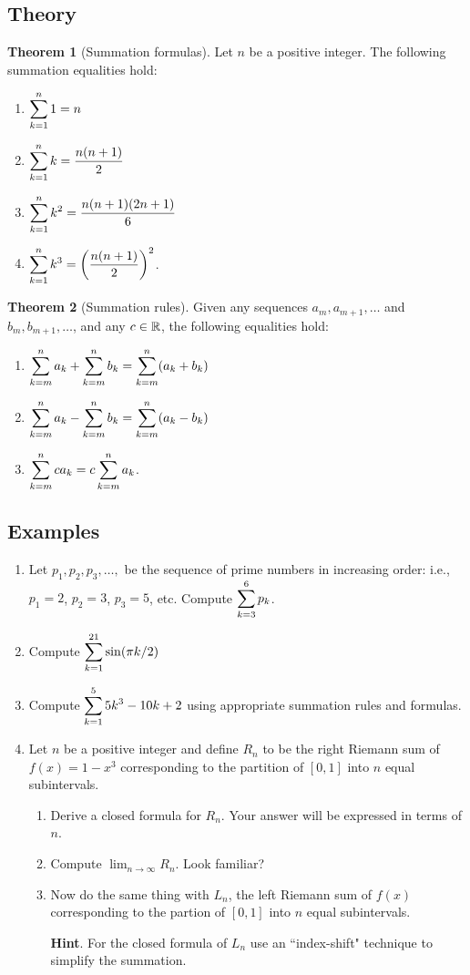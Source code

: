 \documentclass[11pt]{article}
\theoremstyle{definition}
\theoremstyle{named}
\newtheorem*{namedtheorem}{Theorem}
\numberwithin{myalgctr}{section}
\begin{document}
 \subsection*{Theory}
 \begin{namedtheorem}[Summation formulas] Let $n$ be a positive integer. The following summation equalities hold:
   \begin{enumerate}[topsep=0pt, itemsep=0pt]
     \item $\displaystyle\sum_{k=1}^n 1=n$
     \item $\displaystyle \sum_{k=1}^nk=\frac{n(n+1)}{2}$
     \item $\displaystyle\sum_{k=1}^nk^2=\frac{n(n+1)(2n+1)}{6}$
     \item $\displaystyle \sum_{k=1}^nk^3=\left(\frac{n(n+1)}{2}\right)^2$.
   \end{enumerate}

 \end{namedtheorem}
\begin{namedtheorem}[Summation rules]
Given any sequences $a_m, a_{m+1}, \dots$ and $b_m, b_{m+1}, \dots$, and any $c\in {\mathbb R}$, the following equalities hold:
\begin{enumerate}
  \item $\displaystyle\sum_{k=m}^na_k+\sum_{k=m}^nb_k=\sum_{k=m}^n(a_k+b_k)$
  \item $\displaystyle\sum_{k=m}^na_k-\sum_{k=m}^nb_k=\sum_{k=m}^n(a_k-b_k)$
  \item $\displaystyle\sum_{k=m}^nca_k=c\sum_{k=m}^na_k$.
\end{enumerate}

\end{namedtheorem}

\subsection*{Examples}
\begin{enumerate}
  \item Let $p_1, p_2,p_3, \dots, $ be the sequence of prime numbers in increasing order: i.e., $p_1=2$, $p_2=3$, $p_3=5$, etc. Compute
  $
  \displaystyle\sum_{k=3}^{6}p_k
  $.
  \item Compute
  $
  \displaystyle \sum_{k=1}^{21}\sin(\pi k/2)
  $
  \item Compute $\displaystyle \sum_{k=1}^{5} 5k^3-10k+2$ using appropriate summation rules and formulas.
  \item Let $n$ be a positive integer and define $R_n$ to be the right Riemann sum of $f(x)=1-x^3$ corresponding to the partition of $[0,1]$ into $n$ equal subintervals.
  \begin{enumerate}
    \item Derive a closed formula for $R_n$. Your answer will be expressed in terms of $n$.
    \item Compute $\lim_{n\to \infty}R_n$. Look familiar?
    \item Now do the same thing with $L_n$, the left Riemann sum of $f(x)$ corresponding to the partion of $[0,1]$ into $n$ equal subintervals.

    {\bf Hint}. For the closed formula of $L_n$ use an ``index-shift" technique to simplify the summation.
  \end{enumerate}
\end{enumerate}
\end{document}

